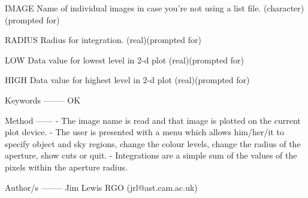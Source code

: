 \begin{description}
\begin{terminalv}
 IMAGE     Name of individual images in case you're not using a
           list file. (character)(prompted for)

 RADIUS    Radius for integration. (real)(prompted for)

 LOW       Data value for lowest level in 2-d plot (real)(prompted for)

 HIGH      Data value for highest level in 2-d plot (real)(prompted for)

 Keywords
 --------
 OK

 Method
 ------
 - The image name is read and that image is plotted on the current
   plot device.
 - The user is presented with a menu which allows him/her/it to specify
   object and sky regions, change the colour levels, change the radius
   of the aperture, show cuts or quit.
 - Integrations are a simple sum of the values of the pixels within the
   aperture radius.

 Author/s
 --------
 Jim Lewis RGO (jrl@ast.cam.ac.uk)
\end{terminalv}
\end{description}

